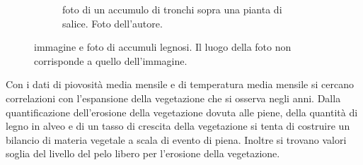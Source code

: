 \begin{figure}
\begin{subfigure}[b]{0.44\textwidth}
		\caption{foto di un accumulo di tronchi sopra una pianta di salice.
		Foto dell'autore.}
		\label{fig:esempio-accumulo-1}
	\end{subfigure}
	\caption[immagine e foto di accumuli legnosi]{immagine e foto di accumuli legnosi. Il luogo della foto non corrisponde a quello dell'immagine.}
\end{figure}

Con i dati di piovosità media mensile e di temperatura media mensile si cercano correlazioni con l'espansione della vegetazione che si osserva negli anni.
Dalla quantificazione dell'erosione della vegetazione dovuta alle piene, della quantità di legno in alveo e di un tasso di crescita della vegetazione si tenta di costruire un bilancio di materia vegetale a scala di evento di piena.
Inoltre si trovano valori soglia del livello del pelo libero per l'erosione della vegetazione.


